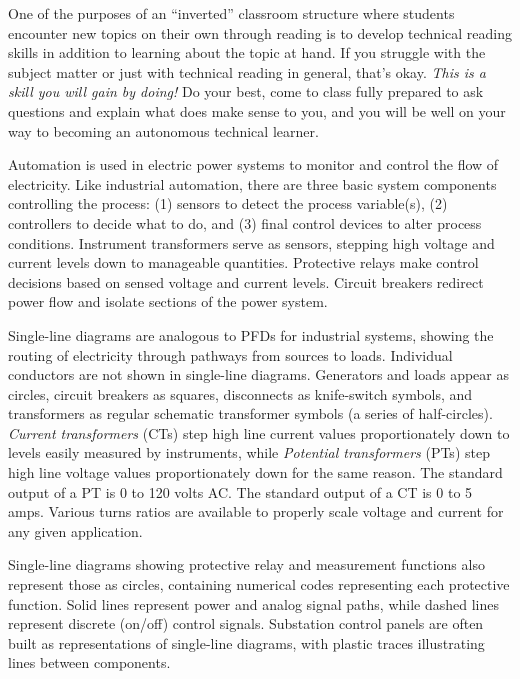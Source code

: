 \vskip 10pt

One of the purposes of an ``inverted'' classroom structure where students encounter new topics on their own through reading is to develop technical reading skills in addition to learning about the topic at hand.  If you struggle with the subject matter or just with technical reading in general, that's okay.  {\it This is a skill you will gain by doing!}  Do your best, come to class fully prepared to ask questions and explain what does make sense to you, and you will be well on your way to becoming an autonomous technical learner.
 






Automation is used in electric power systems to monitor and control the flow of electricity.  Like industrial automation, there are three basic system components controlling the process: (1) sensors to detect the process variable(s), (2) controllers to decide what to do, and (3) final control devices to alter process conditions.  Instrument transformers serve as sensors, stepping high voltage and current levels down to manageable quantities.  Protective relays make control decisions based on sensed voltage and current levels.  Circuit breakers redirect power flow and isolate sections of the power system.

\vskip 10pt

Single-line diagrams are analogous to PFDs for industrial systems, showing the routing of electricity through pathways from sources to loads.  Individual conductors are not shown in single-line diagrams.  Generators and loads appear as circles, circuit breakers as squares, disconnects as knife-switch symbols, and transformers as regular schematic transformer symbols (a series of half-circles).  {\it Current transformers} (CTs) step high line current values proportionately down to levels easily measured by instruments, while {\it Potential transformers} (PTs) step high line voltage values proportionately down for the same reason.  The standard output of a PT is 0 to 120 volts AC.  The standard output of a CT is 0 to 5 amps.  Various turns ratios are available to properly scale voltage and current for any given application.

Single-line diagrams showing protective relay and measurement functions also represent those as circles, containing numerical codes representing each protective function.  Solid lines represent power and analog signal paths, while dashed lines represent discrete (on/off) control signals.  Substation control panels are often built as representations of single-line diagrams, with plastic traces illustrating lines between components.


